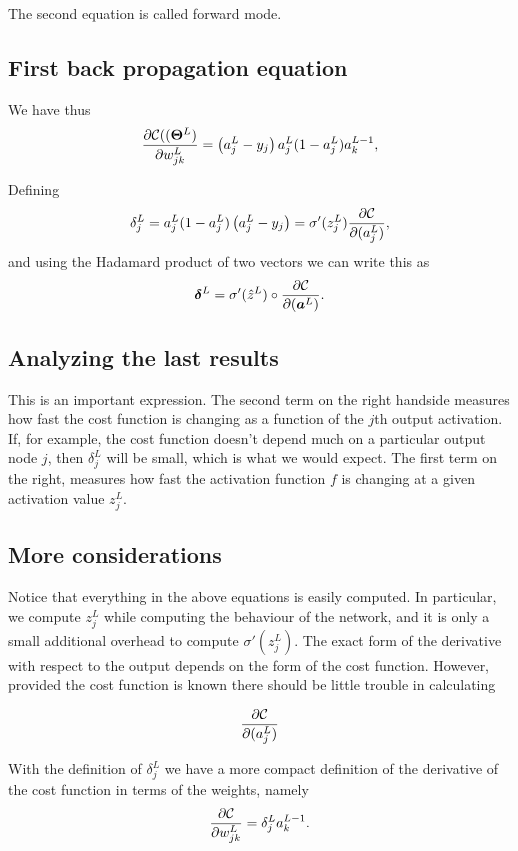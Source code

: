 \documentclass[%
oneside,                 %
final,                   %
10pt]{article}
\begin{document}
The second equation is called forward mode.

\subsection{First back propagation equation}

We have thus
\[
\frac{\partial{\cal C}((\bm{\Theta}^L)}{\partial w_{jk}^L}  =  \left(a_j^L - y_j\right)a_j^L(1-a_j^L)a_k^{L-1}, 
\]

Defining
\[
\delta_j^L = a_j^L(1-a_j^L)\left(a_j^L - y_j\right) = \sigma'(z_j^L)\frac{\partial {\cal C}}{\partial (a_j^L)},
\]
and using the Hadamard product of two vectors we can write this as
\[
\bm{\delta}^L = \sigma'(\hat{z}^L)\circ\frac{\partial {\cal C}}{\partial (\bm{a}^L)}.
\]

\subsection{Analyzing the last results}

This is an important expression. The second term on the right handside
measures how fast the cost function is changing as a function of the $j$th
output activation.  If, for example, the cost function doesn't depend
much on a particular output node $j$, then $\delta_j^L$ will be small,
which is what we would expect. The first term on the right, measures
how fast the activation function $f$ is changing at a given activation
value $z_j^L$.

\subsection{More considerations}

Notice that everything in the above equations is easily computed.  In
particular, we compute $z_j^L$ while computing the behaviour of the
network, and it is only a small additional overhead to compute
$\sigma'(z^L_j)$.  The exact form of the derivative with respect to the
output depends on the form of the cost function.
However, provided the cost function is known there should be little
trouble in calculating

\[
\frac{\partial {\cal C}}{\partial (a_j^L)}
\]

With the definition of $\delta_j^L$ we have a more compact definition of the derivative of the cost function in terms of the weights, namely
\[
\frac{\partial{\cal C}}{\partial w_{jk}^L}  =  \delta_j^La_k^{L-1}.
\]
\end{document}
